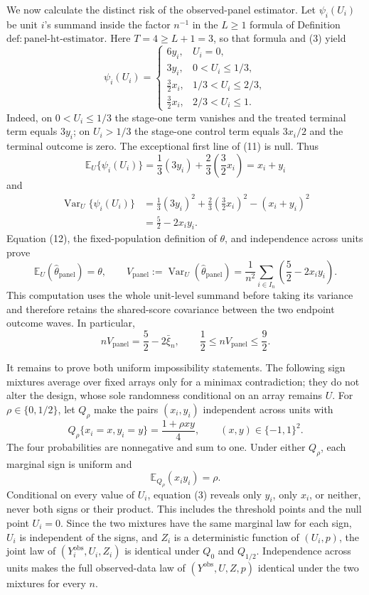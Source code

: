 We now calculate the distinct risk of the observed-panel estimator.  Let \(\psi_i(U_i)\) be unit \(i\)'s summand inside the factor \(n^{-1}\) in the \(L\ge1\) formula of Definition \(\mathrm{def:panel\text{-}ht\text{-}estimator}\).  Here \(T=4\ge L+1=3\), so that formula and (3) yield
\[
\psi_i(U_i)=
\begin{cases}
6y_i,&U_i=0,\\
3y_i,&0<U_i\le1/3,\\
\frac32x_i,&1/3<U_i\le2/3,\\
\frac32x_i,&2/3<U_i\le1.
\end{cases}
\tag{11}
\]
Indeed, on \(0<U_i\le1/3\) the stage-one term vanishes and the treated terminal term equals \(3y_i\); on \(U_i>1/3\) the stage-one control term equals \(3x_i/2\) and the terminal outcome is zero.  The exceptional first line of (11) is null.  Thus
\[
\mathbb E_U\{\psi_i(U_i)\}
=\frac13(3y_i)+\frac23\left(\frac32x_i\right)
=x_i+y_i
\tag{12}
\]
and
\[
\begin{aligned}
\operatorname{Var}_U\{\psi_i(U_i)\}
&=\frac13(3y_i)^2+\frac23\left(\frac32x_i\right)^2-(x_i+y_i)^2\\
&=\frac52-2x_i y_i.
\end{aligned}
\tag{13}
\]
Equation (12), the fixed-population definition of \(\theta\), and independence across units prove
\[
\mathbb E_U(\widehat\theta_{\mathrm{panel}})=\theta,
\qquad
V_{\mathrm{panel}}
:=\operatorname{Var}_U(\widehat\theta_{\mathrm{panel}})
=\frac1{n^2}\sum_{i\in I_n}\left(\frac52-2x_i y_i\right).
\tag{14}
\]
This computation uses the whole unit-level summand before taking its variance and therefore retains the shared-score covariance between the two endpoint outcome waves.  In particular,
\[
nV_{\mathrm{panel}}=\frac52-2\bar\xi_n,
\qquad
\frac12\le nV_{\mathrm{panel}}\le\frac92.
\tag{15}
\]

It remains to prove both uniform impossibility statements.  The following sign mixtures average over fixed arrays only for a minimax contradiction; they do not alter the design, whose sole randomness conditional on an array remains \(U\).  For \(\rho\in\{0,1/2\}\), let \(Q_\rho\) make the pairs \((x_i,y_i)\) independent across units with
\[
Q_\rho\{x_i=x,y_i=y\}=\frac{1+\rho xy}{4},
\qquad (x,y)\in\{-1,1\}^2.
\tag{16}
\]
The four probabilities are nonnegative and sum to one.  Under either \(Q_\rho\), each marginal sign is uniform and
\[
\mathbb E_{Q_\rho}(x_i y_i)=\rho.
\tag{17}
\]
Conditional on every value of \(U_i\), equation (3) reveals only \(y_i\), only \(x_i\), or neither, never both signs or their product.  This includes the threshold points and the null point \(U_i=0\).  Since the two mixtures have the same marginal law for each sign, \(U_i\) is independent of the signs, and \(Z_i\) is a deterministic function of \((U_i,p)\), the joint law of \((Y_i^{\mathrm{obs}},U_i,Z_i)\) is identical under \(Q_0\) and \(Q_{1/2}\).  Independence across units makes the full observed-data law of \((Y^{\mathrm{obs}},U,Z,p)\) identical under the two mixtures for every \(n\).

